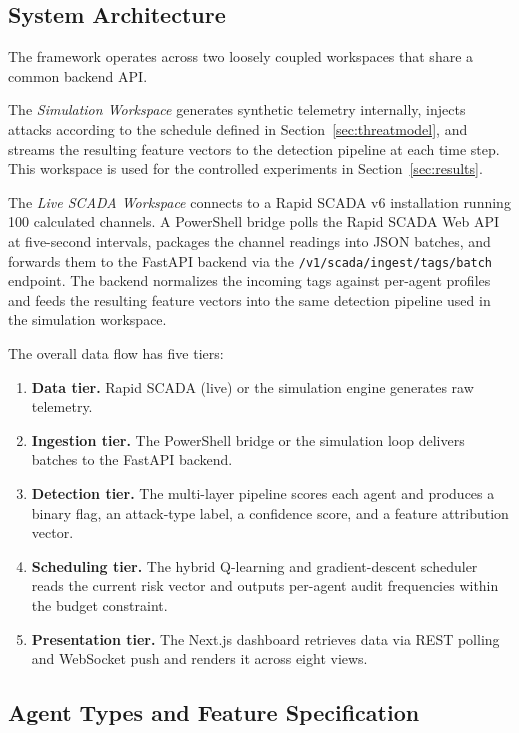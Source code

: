 \subsection{System Architecture}
\label{sec:arch}

The framework operates across two loosely coupled workspaces that share a common backend API.

The \textit{Simulation Workspace} generates synthetic telemetry internally, injects attacks
according to the schedule defined in Section~\ref{sec:threatmodel}, and streams the resulting
feature vectors to the detection pipeline at each time step. This workspace is used for the
controlled experiments in Section~\ref{sec:results}.

The \textit{Live SCADA Workspace} connects to a Rapid SCADA v6 installation running 100 calculated
channels. A PowerShell bridge polls the Rapid SCADA Web API at five-second intervals, packages the
channel readings into JSON batches, and forwards them to the FastAPI backend via the
\texttt{/v1/scada/ingest/tags/batch} endpoint. The backend normalizes the incoming tags against
per-agent profiles and feeds the resulting feature vectors into the same detection pipeline used in
the simulation workspace.

The overall data flow has five tiers:

\begin{enumerate}
    \item \textbf{Data tier.} Rapid SCADA (live) or the simulation engine generates raw telemetry.
    \item \textbf{Ingestion tier.} The PowerShell bridge or the simulation loop delivers batches to
    the FastAPI backend.
    \item \textbf{Detection tier.} The multi-layer pipeline scores each agent and produces a binary
    flag, an attack-type label, a confidence score, and a feature attribution vector.
    \item \textbf{Scheduling tier.} The hybrid Q-learning and gradient-descent scheduler reads the
    current risk vector and outputs per-agent audit frequencies within the budget constraint.
    \item \textbf{Presentation tier.} The Next.js dashboard retrieves data via REST polling and
    WebSocket push and renders it across eight views.
\end{enumerate}

\subsection{Agent Types and Feature Specification}
\label{sec:agents}

